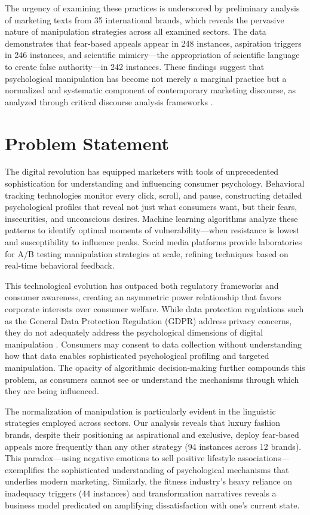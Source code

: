 The urgency of examining these practices is underscored by preliminary analysis of marketing texts from 35 international brands, which reveals the pervasive nature of manipulation strategies across all examined sectors. The data demonstrates that fear-based appeals appear in 248 instances, aspiration triggers in 246 instances, and scientific mimicry—the appropriation of scientific language to create false authority—in 242 instances. These findings suggest that psychological manipulation has become not merely a marginal practice but a normalized and systematic component of contemporary marketing discourse, as analyzed through critical discourse analysis frameworks \cite{fairclough2015language}.

\section{Problem Statement}
\label{sec:problem_statement}

The digital revolution has equipped marketers with tools of unprecedented sophistication for understanding and influencing consumer psychology. Behavioral tracking technologies monitor every click, scroll, and pause, constructing detailed psychological profiles that reveal not just what consumers want, but their fears, insecurities, and unconscious desires. Machine learning algorithms analyze these patterns to identify optimal moments of vulnerability—when resistance is lowest and susceptibility to influence peaks. Social media platforms provide laboratories for A/B testing manipulation strategies at scale, refining techniques based on real-time behavioral feedback.

This technological evolution has outpaced both regulatory frameworks and consumer awareness, creating an asymmetric power relationship that favors corporate interests over consumer welfare. While data protection regulations such as the General Data Protection Regulation (GDPR) address privacy concerns, they do not adequately address the psychological dimensions of digital manipulation \cite{calo2014digital}. Consumers may consent to data collection without understanding how that data enables sophisticated psychological profiling and targeted manipulation. The opacity of algorithmic decision-making further compounds this problem, as consumers cannot see or understand the mechanisms through which they are being influenced.

The normalization of manipulation is particularly evident in the linguistic strategies employed across sectors. Our analysis reveals that luxury fashion brands, despite their positioning as aspirational and exclusive, deploy fear-based appeals more frequently than any other strategy (94 instances across 12 brands). This paradox—using negative emotions to sell positive lifestyle associations—exemplifies the sophisticated understanding of psychological mechanisms that underlies modern marketing. Similarly, the fitness industry's heavy reliance on inadequacy triggers (44 instances) and transformation narratives reveals a business model predicated on amplifying dissatisfaction with one's current state.


